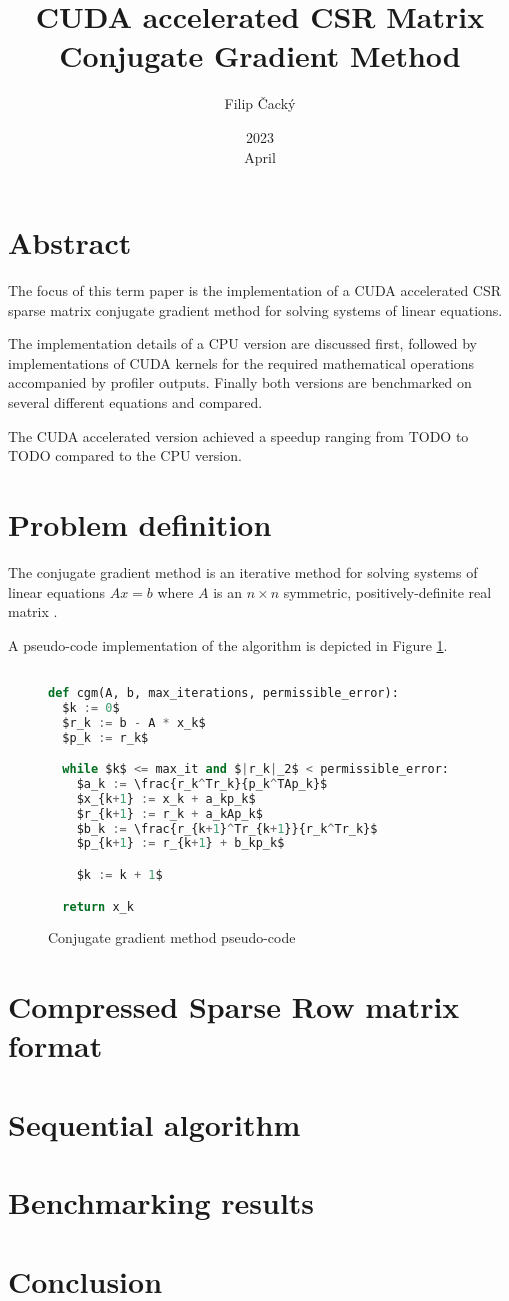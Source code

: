 \documentclass{article}
\title{CUDA accelerated CSR Matrix Conjugate Gradient Method}
\author{Filip Čacký}
\date{2023\\ April}
\begin{document}
\maketitle

\section{Abstract}
The focus of this term paper is the implementation of a CUDA accelerated CSR sparse matrix
conjugate gradient method for solving systems of linear equations.

The implementation details of a CPU version are discussed first,
followed by implementations of CUDA kernels for the required mathematical operations
accompanied by profiler outputs.
Finally both versions are benchmarked on several different equations and compared.

The CUDA accelerated version achieved a speedup ranging from TODO to TODO
compared to the CPU version.

\section{Problem definition}
The conjugate gradient method is an iterative method for solving systems of linear equations $Ax = b$
where $A$ is an $n\times n$ symmetric, positively-definite real matrix \cite{wiki_cgm}.

A pseudo-code implementation of the algorithm is depicted in Figure \ref{code:cgm_pseudo}.

\begin{figure}[H]
\begin{lstlisting}[language=Python,mathescape=true]

def cgm(A, b, max_iterations, permissible_error):
  $k := 0$
  $r_k := b - A * x_k$
  $p_k := r_k$

  while $k$ <= max_it and $|r_k|_2$ < permissible_error: 
    $a_k := \frac{r_k^Tr_k}{p_k^TAp_k}$
    $x_{k+1} := x_k + a_kp_k$
    $r_{k+1} := r_k + a_kAp_k$
    $b_k := \frac{r_{k+1}^Tr_{k+1}}{r_k^Tr_k}$
    $p_{k+1} := r_{k+1} + b_kp_k$

    $k := k + 1$

  return x_k

\end{lstlisting}
\caption{Conjugate gradient method pseudo-code \cite{wiki_cgm}}
\label{code:cgm_pseudo}
\end{figure}

\section{Compressed Sparse Row matrix format}

\section{Sequential algorithm}

\section{Benchmarking results}

\section{Conclusion}

 

\end{document}
